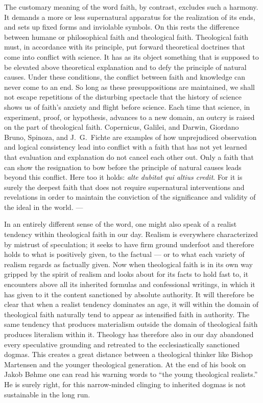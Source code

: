\documentclass[12pt,a4paper,openany]{book}
\newcommand{\opage}[1]{\marginnote{\footnotesize\textit{[#1]}}}
\begin{document}
The customary meaning of the word faith, by contrast, excludes such a harmony. It demands a more or less supernatural apparatus for the realization of its ends, and sets up fixed forms and inviolable symbols. On this rests the difference between humane or philosophical faith and theological faith. Theological faith must, in accordance with its principle, put forward theoretical doctrines that come into conflict with science. It has as its object something that is supposed to be
\opage{12}elevated above theoretical explanation and to defy the principle of natural causes. Under these conditions, the conflict between faith and knowledge can never come to an end. So long as these presuppositions are maintained, we shall not escape repetitions of the disturbing spectacle that the history of science shows us of faith's anxiety and flight before science. Each time that science, in experiment, proof, or hypothesis, advances to a new domain, an outcry is raised on the part of theological faith. Copernicus, Galilei, and Darwin, Giordano Bruno, Spinoza, and J.\ G.\ Fichte are examples of how unprejudiced observation and logical consistency lead into conflict with a faith that has not yet learned that evaluation and explanation do not cancel each other out. Only a faith that can show the resignation to bow before the principle of natural causes leads beyond this conflict. Here too it holds: \textit{alte dubitat qui altius credit}. For it is surely the deepest faith that does not require supernatural interventions and revelations in order to maintain the conviction of the significance and validity of the ideal in the world. ---

In an entirely different sense of the word, one might also speak of a realist tendency within theological faith in our day. Realism is everywhere characterized by mistrust of speculation; it seeks to have firm ground underfoot and therefore holds to what is positively given, to the factual --- or to what each variety of realism regards as factually given. Now when theological faith is in its own way gripped by the spirit of realism and looks about for its facts to hold fast to, it encounters above all its inherited formulas and confessional writings, in which it has given to it the content sanctioned by absolute authority. It will therefore be clear that when a realist tendency dominates an age, it will within the domain of theological faith naturally tend to appear as intensified faith in authority. The same tendency that produces materialism outside the domain of theological faith produces literalism within it. Theology has therefore also in our day abandoned every speculative grounding and retreated to the ecclesiastically sanctioned dogmas.
\opage{13}This creates a great distance between a theological thinker like Bishop Martensen and the younger theological generation. At the end of his book on Jakob Bøhme one can read his warning words to ``the young theological realists.'' He is surely right, for this narrow-minded clinging to inherited dogmas is not sustainable in the long run.
\end{document}
